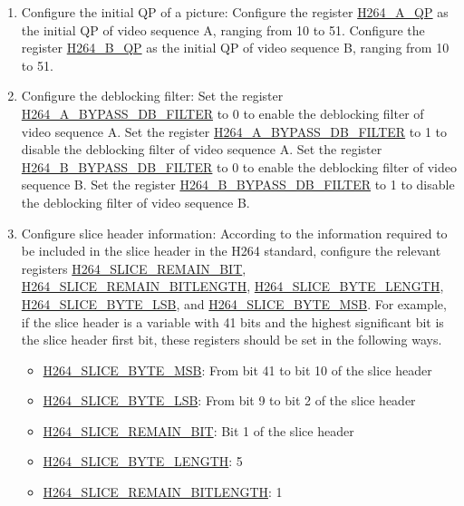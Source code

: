 \documentclass[main\_\_EN.tex]{subfiles}
\begin{document}
\begin{enumerate}
\begin{enumerate}
        \item Configure the initial QP of a picture: Configure the register \hyperref[fielddesc:H264AQP]{H264\_A\_QP} as the initial QP of video sequence A, ranging from 10 to 51. Configure the register \hyperref[fielddesc:H264BQP]{H264\_B\_QP} as the initial QP of video sequence B, ranging from 10 to 51.
        \item Configure the deblocking filter: Set the register \hyperref[fielddesc:H264ABYPASSDBFILTER]{H264\_A\_BYPASS\_DB\_FILTER} to 0 to enable the deblocking filter of video sequence A. Set the register \hyperref[fielddesc:H264ABYPASSDBFILTER]{H264\_A\_BYPASS\_DB\_FILTER} to 1 to disable the deblocking filter of video sequence A. Set the register \hyperref[fielddesc:H264BBYPASSDBFILTER]{H264\_B\_BYPASS\_DB\_FILTER} to 0 to enable the deblocking filter of video sequence B. Set the register \hyperref[fielddesc:H264BBYPASSDBFILTER]{H264\_B\_BYPASS\_DB\_FILTER} to 1 to disable the deblocking filter of video sequence B.
        \item Configure slice header information: According to the information required to be included in the slice header in the H264 standard, configure the relevant registers \hyperref[fielddesc:H264SLICEREMAINBIT]{H264\_SLICE\_REMAIN\_BIT}, \hyperref[fielddesc:H264SLICEREMAINBITLENGTH]{H264\_SLICE\_REMAIN\_BITLENGTH}, \hyperref[fielddesc:H264SLICEBYTELENGTH]{H264\_SLICE\_BYTE\_LENGTH}, \hyperref[fielddesc:H264SLICEBYTELSB]{H264\_SLICE\_BYTE\_LSB}, and \hyperref[fielddesc:H264SLICEBYTEMSB]{H264\_SLICE\_BYTE\_MSB}. For example, if the slice header is a variable with 41 bits and the highest significant bit is the slice header first bit, these registers should be set in the following ways.
            \begin{itemize}
                \item \hyperref[fielddesc:H264SLICEBYTEMSB]{H264\_SLICE\_BYTE\_MSB}: From bit 41 to bit 10 of the slice header
                \item \hyperref[fielddesc:H264SLICEBYTELSB]{H264\_SLICE\_BYTE\_LSB}: From bit 9 to bit 2 of the slice header
                \item \hyperref[fielddesc:H264SLICEREMAINBIT]{H264\_SLICE\_REMAIN\_BIT}: Bit 1 of the slice header
                \item \hyperref[fielddesc:H264SLICEBYTELENGTH]{H264\_SLICE\_BYTE\_LENGTH}: 5
                \item \hyperref[fielddesc:H264SLICEREMAINBITLENGTH]{H264\_SLICE\_REMAIN\_BITLENGTH}: 1
            \end{itemize}

\end{enumerate}
\end{enumerate}
\end{document}
